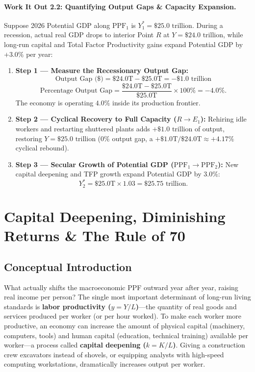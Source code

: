 \documentclass[11pt,letterpaper]{article}
\begin{document}
\paragraph{Work It Out 2.2: Quantifying Output Gaps \& Capacity Expansion.}
Suppose 2026 Potential GDP along $\text{PPF}_1$ is $Y^*_1 = \$25.0\text{ trillion}$. During a recession, actual real GDP drops to interior Point $R$ at $Y = \$24.0\text{ trillion}$, while long-run capital and Total Factor Productivity gains expand Potential GDP by $+3.0\%$ per year:
\begin{enumerate}
  \item \textbf{Step 1 — Measure the Recessionary Output Gap:}
  $$\text{Output Gap (\$)} = \$24.0\text{T} - \$25.0\text{T} = -\$1.0\text{ trillion}$$
  $$\text{Percentage Output Gap} = \frac{\$24.0\text{T} - \$25.0\text{T}}{\$25.0\text{T}} \times 100\% = -4.0\%.$$
  The economy is operating $4.0\%$ inside its production frontier.
  \item \textbf{Step 2 — Cyclical Recovery to Full Capacity ($R \to E_1$):}
  Rehiring idle workers and restarting shuttered plants adds $+\$1.0\text{ trillion}$ of output, restoring $Y = \$25.0\text{ trillion}$ ($0\%$ output gap, a $+\$1.0\text{T} / \$24.0\text{T} \approx +4.17\%$ cyclical rebound).
  \item \textbf{Step 3 — Secular Growth of Potential GDP ($\text{PPF}_1 \to \text{PPF}_2$):}
  New capital deepening and TFP growth expand Potential GDP by $3.0\%$:
  $$Y^*_2 = \$25.0\text{T} \times 1.03 = \$25.75\text{ trillion}.$$
\end{enumerate}

\section{Capital Deepening, Diminishing Returns \& The Rule of 70}

\subsection*{Conceptual Introduction}
What actually shifts the macroeconomic PPF outward year after year, raising real income per person? The single most important determinant of long-run living standards is \textbf{labor productivity ($y = Y/L$)}—the quantity of real goods and services produced per worker (or per hour worked). To make each worker more productive, an economy can increase the amount of physical capital (machinery, computers, tools) and human capital (education, technical training) available per worker—a process called \textbf{capital deepening ($k = K/L$)}. Giving a construction crew excavators instead of shovels, or equipping analysts with high-speed computing workstations, dramatically increases output per worker.
\end{document}
